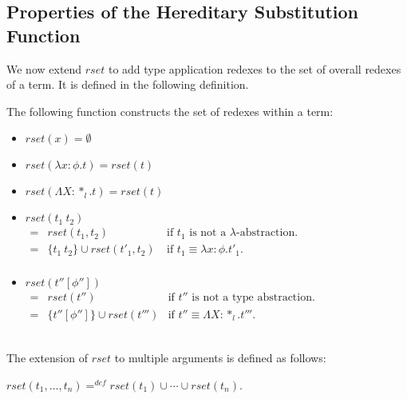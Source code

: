 \subsection{Properties of the Hereditary Substitution Function}
\label{sec:properties_of_the_hereditary_substitution_function_ssf}
We now extend $rset$ to add type application redexes to the set of overall redexes
of a term.  It is defined in the following definition.  
\begin{definition}
  \label{def:rset_ssf}
  The following function constructs the set of redexes within a term:

  \begin{center}
    \begin{itemize}
    \item[] $rset(x) = \emptyset$\\
    \item[] $rset(\lambda x:\phi.t) = rset(t)$\\
    \item[] $rset(\Lambda X:*_l.t) = rset(t)$\\
    \item[] $rset(t_1\ t_2)$\\
      \begin{math}
        \begin{array}{lll}
          = & rset(t_1, t_2) & \text{if } t_1 \text{ is not a } \lambda \text{-abstraction.}\\
          = & \{t_1\ t_2\} \cup rset(t'_1, t_2)\ & \text{if } t_1 \equiv \lambda x:\phi.t'_1.\\
        \end{array}
      \end{math}
    \item[] $rset(t''[\phi''])$\\
      \begin{math}
        \begin{array}{lll}
          = & rset(t'') & \text{if } t'' \text{ is not a type abstraction.}\\
          = & \{t''[\phi'']\} \cup rset(t''') & \text{if } t'' \equiv \Lambda X:*_l.t'''.
        \end{array}
      \end{math}
    \end{itemize}
  \end{center}
  \ \\
  The extension of $rset$ to multiple arguments is defined as follows:
  \begin{center}
    $rset(t_1, \ldots, t_n) =^{def} rset(t_1) \cup \cdots \cup rset(t_n)$.
  \end{center}
\end{definition}
